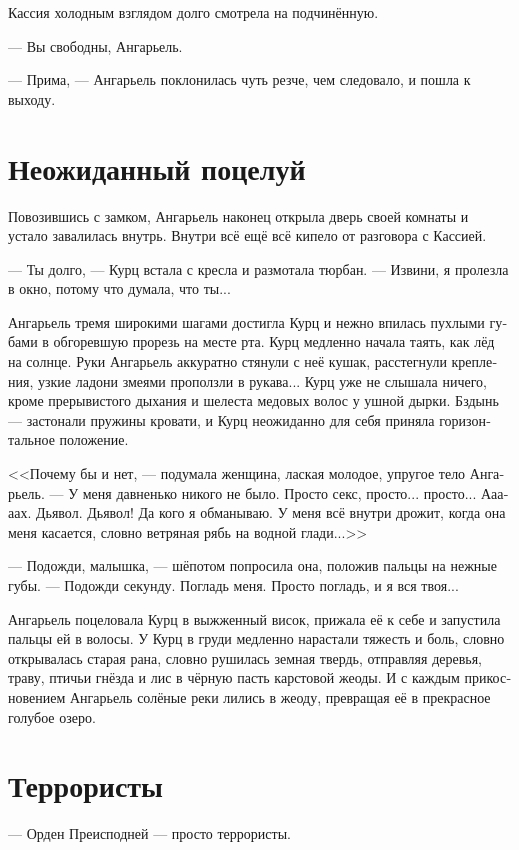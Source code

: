 \documentclass[a4paper,12pt,fleqn]{book}\usepackage{polyglossia}\setdefaultlanguage[babelshorthands=true]{russian}\setotherlanguage{english}\defaultfontfeatures{Ligatures=TeX,Mapping=tex-text}\usepackage{xcolor}\newcommand{\ml}[3]{#2}
\begin{document}
Кассия холодным взглядом долго смотрела на подчинённую.

--- Вы свободны, Ангарьель.

--- Прима, --- Ангарьель поклонилась чуть резче, чем следовало, и пошла к выходу.

\section{Неожиданный поцелуй}

Повозившись с замком, Ангарьель наконец открыла дверь своей комнаты и устало завалилась внутрь.
Внутри всё ещё всё кипело от разговора с Кассией.

--- Ты долго, --- Курц встала с кресла и размотала тюрбан.
--- Извини, я пролезла в окно, потому что думала, что ты...

Ангарьель тремя широкими шагами достигла Курц и нежно впилась пухлыми губами в обгоревшую прорезь на месте рта.
Курц медленно начала таять, как лёд на солнце.
Руки Ангарьель аккуратно стянули с неё кушак, расстегнули крепления, узкие ладони змеями проползли в рукава...
Курц уже не слышала ничего, кроме прерывистого дыхания и шелеста медовых волос у ушной дырки.
Бздынь --- застонали пружины кровати, и Курц неожиданно для себя приняла горизонтальное положение.

<<Почему бы и нет, --- подумала женщина, лаская молодое, упругое тело Ангарьель.
--- У меня давненько никого не было.
Просто секс, просто... просто...
Ааааах.
Дьявол.
Дьявол!
Да кого я обманываю.
У меня всё внутри дрожит, когда она меня касается, словно ветряная рябь на водной глади...>>

--- Подожди, малышка, --- шёпотом попросила она, положив пальцы на нежные губы.
--- Подожди секунду.
Погладь меня.
Просто погладь, и я вся твоя...

Ангарьель поцеловала Курц в выжженный висок, прижала её к себе и запустила пальцы ей в волосы.
У Курц в груди медленно нарастали тяжесть и боль, словно открывалась старая рана, словно рушилась земная твердь, отправляя деревья, траву, птичьи гнёзда и лис в чёрную пасть карстовой жеоды.
И с каждым прикосновением Ангарьель солёные реки лились в жеоду, превращая её в прекрасное голубое озеро.

\section{Террористы}

--- Орден Преисподней --- просто террористы.
\end{document}
